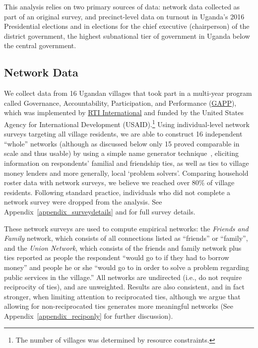 \documentclass[12pt]{article}
\begin{document}
This analysis relies on two primary sources of data: network data collected as part of an original survey, and precinct-level data on turnout in Uganda's 2016 Presidential elections and in elections for the chief executive (chairperson) of the district government, the highest subnational tier of government in Uganda below the central government.

\subsection{Network Data}\label{section_data_network}

We collect data from 16 Ugandan villages that took part in a multi-year program called Governance, Accountability, Participation, and Performance (\href{https://www.rti.org/impact/uganda-governance-accountability-participation-and-performance-gapp}{GAPP}), which was implemented by \href{https://www.rti.org/}{RTI International} and funded by the United States Agency for International Development (USAID).\footnote{The number of villages was determined by resource constraints.} Using individual-level network surveys targeting all village residents, we are able to construct 16 independent ``whole'' networks (although as discussed below only 15 proved comparable in scale and thus usable) by using a simple name generator technique~\citep{Knoke:2008vc}, eliciting information on respondents' familial and friendship ties, as well as ties to village money lenders and more generally, local `problem solvers'. Comparing household roster data with network surveys, we believe we reached over 80\% of village residents. Following standard practice, individuals who did not complete a network survey were dropped from the analysis. See Appendix~\ref{appendix_surveydetails} and \citet{Ferrali:uIYD9guX} for full survey details.

These network surveys are used to compute empirical networks: the \emph{Friends and Family} network, which consists of all connections listed as ``friends'' or ``family'', and the \emph{Union Network}, which consists of the friends and family network plus ties reported as people the respondent ``would go to if they had to borrow money'' and people he or she ``would go to in order to solve a problem regarding public services in the village.'' All networks are undirected (i.e., do not require reciprocity of ties), and are unweighted. Results are also consistent, and in fact stronger, when limiting attention to reciprocated ties, although we argue that allowing for non-reciprocated ties generates more meaningful networks (See Appendix~\ref{appendix_reciponly} for further discussion).
\end{document}
